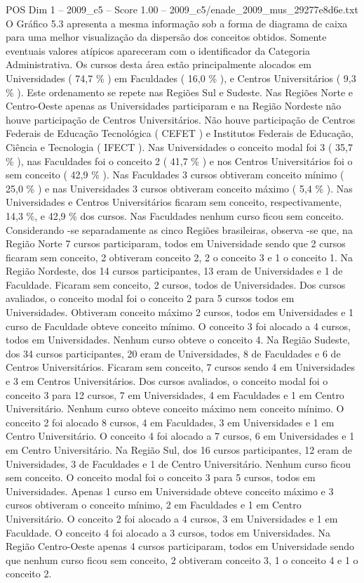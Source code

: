 \begin{textsample}{POS Dim 1 – 2009\_c5 – Score 1.00 – 2009\_c5/enade\_2009\_mus\_29277e8d6e.txt}
O Gráfico 5.3 apresenta a mesma informação sob a forma de diagrama de caixa para uma melhor visualização da dispersão dos conceitos obtidos.
Somente eventuais valores atípicos apareceram com o identificador da Categoria Administrativa.
Os cursos desta área estão principalmente alocados em Universidades ( 74,7 \% ) em Faculdades ( 16,0 \% ), e Centros Universitários ( 9,3 \% ).
Este ordenamento se repete nas Regiões Sul e Sudeste.
Nas Regiões Norte e Centro-Oeste apenas as Universidades participaram e na Região Nordeste não houve participação de Centros Universitários.
Não houve participação de Centros Federais de Educação Tecnológica ( CEFET ) e Institutos Federais de Educação, Ciência e Tecnologia ( IFECT ).
Nas Universidades o conceito modal foi 3 ( 35,7 \% ), nas Faculdades foi o conceito 2 ( 41,7 \% ) e nos Centros Universitários foi o sem conceito ( 42,9 \% ).
Nas Faculdades 3 cursos obtiveram conceito mínimo ( 25,0 \% ) e nas Universidades 3 cursos obtiveram conceito máximo ( 5,4 \% ).
Nas Universidades e Centros Universitários ficaram sem conceito, respectivamente, 14,3 \%, e 42,9 \% dos cursos.
Nas Faculdades nenhum curso ficou sem conceito.
Considerando -se separadamente as cinco Regiões brasileiras, observa -se que, na Região Norte 7 cursos participaram, todos em Universidade sendo que 2 cursos ficaram sem conceito, 2 obtiveram conceito 2, 2 o conceito 3 e 1 o conceito 1.
Na Região Nordeste, dos 14 cursos participantes, 13 eram de Universidades e 1 de Faculdade.
Ficaram sem conceito, 2 cursos, todos de Universidades.
Dos cursos avaliados, o conceito modal foi o conceito 2 para 5 cursos todos em Universidades.
Obtiveram conceito máximo 2 cursos, todos em Universidades e 1 curso de Faculdade obteve conceito mínimo.
O conceito 3 foi alocado a 4 cursos, todos em Universidades.
Nenhum curso obteve o conceito 4.
Na Região Sudeste, dos 34 cursos participantes, 20 eram de Universidades, 8 de Faculdades e 6 de Centros Universitários.
Ficaram sem conceito, 7 cursos sendo 4 em Universidades e 3 em Centros Universitários.
Dos cursos avaliados, o conceito modal foi o conceito 3 para 12 cursos, 7 em Universidades, 4 em Faculdades e 1 em Centro Universitário.
Nenhum curso obteve conceito máximo nem conceito mínimo.
O conceito 2 foi alocado 8 cursos, 4 em Faculdades, 3 em Universidades e 1 em Centro Universitário.
O conceito 4 foi alocado a 7 cursos, 6 em Universidades e 1 em Centro Universitário.
Na Região Sul, dos 16 cursos participantes, 12 eram de Universidades, 3 de Faculdades e 1 de Centro Universitário.
Nenhum curso ficou sem conceito.
O conceito modal foi o conceito 3 para 5 cursos, todos em Universidades.
Apenas 1 curso em Universidade obteve conceito máximo e 3 cursos obtiveram o conceito mínimo, 2 em Faculdades e 1 em Centro Universitário.
O conceito 2 foi alocado a 4 cursos, 3 em Universidades e 1 em Faculdade.
O conceito 4 foi alocado a 3 cursos, todos em Universidades.
Na Região Centro-Oeste apenas 4 cursos participaram, todos em Universidade sendo que nenhum curso ficou sem conceito, 2 obtiveram conceito 3, 1 o conceito 4 e 1 o conceito 2.

\end{textsample}
